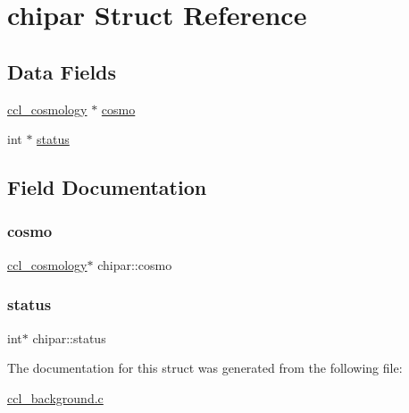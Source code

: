 \hypertarget{structchipar}{}\section{chipar Struct Reference}
\label{structchipar}
\subsection*{Data Fields}
\begin{DoxyCompactItemize}
\item 
\mbox{\hyperlink{structccl__cosmology}{ccl\+\_\+cosmology}} $\ast$ \mbox{\hyperlink{structchipar_a63646337a89b9164c36c5d76757c5cb5}{cosmo}}
\item 
int $\ast$ \mbox{\hyperlink{structchipar_a035d74baeb5c41b4835481658cf1fd12}{status}}
\end{DoxyCompactItemize}


\subsection{Field Documentation}
\mbox{\label{structchipar_a63646337a89b9164c36c5d76757c5cb5}} 
\subsubsection{\texorpdfstring{cosmo}{cosmo}}
{\footnotesize\ttfamily \mbox{\hyperlink{structccl__cosmology}{ccl\+\_\+cosmology}}$\ast$ chipar\+::cosmo}

\mbox{\label{structchipar_a035d74baeb5c41b4835481658cf1fd12}} 
\subsubsection{\texorpdfstring{status}{status}}
{\footnotesize\ttfamily int$\ast$ chipar\+::status}



The documentation for this struct was generated from the following file\+:\begin{DoxyCompactItemize}
\item 
\mbox{\hyperlink{ccl__background_8c}{ccl\+\_\+background.\+c}}\end{DoxyCompactItemize}
